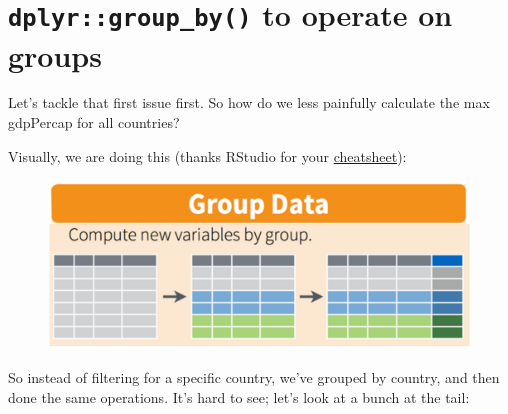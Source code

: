 \documentclass[]{book}
\newenvironment{Shaded}{\begin{snugshade}}{\end{snugshade}}
\newcommand{\KeywordTok}[1]{\textcolor[rgb]{0.13,0.29,0.53}{\textbf{{#1}}}}
\newcommand{\DataTypeTok}[1]{\textcolor[rgb]{0.13,0.29,0.53}{{#1}}}
\newcommand{\DecValTok}[1]{\textcolor[rgb]{0.00,0.00,0.81}{{#1}}}
\newcommand{\StringTok}[1]{\textcolor[rgb]{0.31,0.60,0.02}{{#1}}}
\newcommand{\CommentTok}[1]{\textcolor[rgb]{0.56,0.35,0.01}{\textit{{#1}}}}
\newcommand{\NormalTok}[1]{{#1}}
\theoremstyle{definition}
\theoremstyle{definition}
\theoremstyle{definition}
\theoremstyle{remark}
\begin{document}
\section{\texorpdfstring{\texttt{dplyr::group\_by()} to operate on
groups}{dplyr::group\_by() to operate on groups}}\label{dplyrgroup_by-to-operate-on-groups}

Let's tackle that first issue first. So how do we less painfully
calculate the max gdpPercap for all countries?

Visually, we are doing this (thanks RStudio for your
\href{http://www.rstudio.com/wp-content/uploads/2015/02/data-wrangling-cheatsheet.pdf}{cheatsheet}):

\begin{figure}[htbp]
\centering
\includegraphics{img/rstudio-cheatsheet-group_by.png}
\caption{}
\end{figure}

\begin{Shaded}
\end{Shaded}

So instead of filtering for a specific country, we've grouped by
country, and then done the same operations. It's hard to see; let's look
at a bunch at the tail:

\begin{Shaded}
\end{Shaded}
\end{document}
